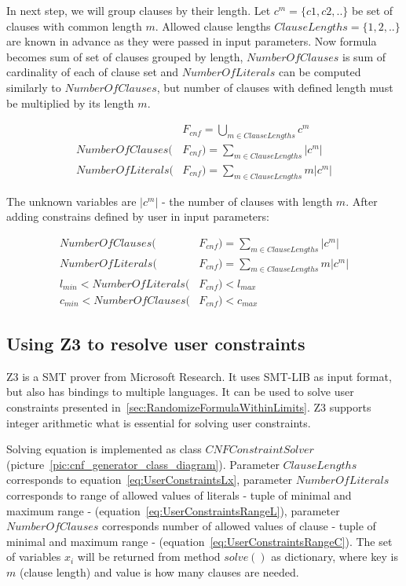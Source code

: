 In next step, we will group clauses by their length. Let $c^m = \{c1,c2,..\}$ be set of clauses with common length $m$. Allowed clause lengths $ClauseLengths=\{1,2,..\}$ are known in advance as they were passed in input parameters. Now formula becomes sum of set of clauses grouped by length, $NumberOfClauses$ is sum of cardinality of each of clause set and $NumberOfLiterals$ can be computed similarly to $NumberOfClauses$, but number of clauses with defined length must be multiplied by its length $m$.

\begin{align*}
  &F_{cnf} = \bigcup_{m \in ClauseLengths} c^m \\
  NumberOfClauses(&F_{cnf}) = \sum_{m \in ClauseLengths} |c^m| \\
  NumberOfLiterals(&F_{cnf}) = \sum_{m \in ClauseLengths} m |c^m| 
\end{align*}

The unknown variables are $|c^m|$ - the number of clauses with length $m$. After adding constrains defined by user in input parameters:

\begin{align}
  NumberOfClauses(&F_{cnf}) = \sum_{m \in ClauseLengths} |c^m| \label{eq:UserConstraintsX}\\
  NumberOfLiterals(&F_{cnf}) = \sum_{m \in ClauseLengths} m |c^m| \label{eq:UserConstraintsLx} \\
  l_{min} < NumberOfLiterals(&F_{cnf})< l_{max} \label{eq:UserConstraintsRangeL}\\
  c_{min} < NumberOfClauses(&F_{cnf}) < c_{max}\label{eq:UserConstraintsRangeC} 
\end{align}

\subsection{Using Z3 to resolve user constraints}

Z3 \cite{Z3Solver} is a \gls{SMT} prover from Microsoft Research. It uses SMT-LIB as input format, but also has bindings to multiple languages. It can be used to solve user constraints presented in~\ref{sec:RandomizeFormulaWithinLimits}. Z3 supports integer arithmetic what is essential for solving user constraints.

Solving equation is implemented as class $CNFConstraintSolver$ (picture~\ref{pic:cnf_generator_class_diagram}). Parameter $ClauseLengths$ corresponds to equation~\ref{eq:UserConstraintsLx}, parameter $NumberOfLiterals$ corresponds to range of allowed values of literals - tuple of minimal and maximum range - (equation~\ref{eq:UserConstraintsRangeL}), parameter $NumberOfClauses$ corresponds number of allowed values of clause - tuple of minimal and maximum range - (equation~\ref{eq:UserConstraintsRangeC}). The set of variables $x_i$ will be returned from method $solve()$ as dictionary, where key is $m$ (clause length) and value is how many clauses are needed.


